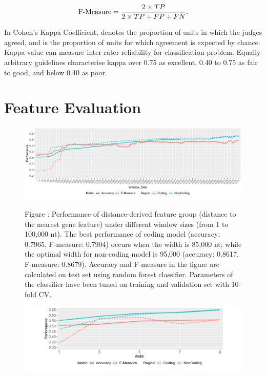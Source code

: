 \documentclass[a4paper,nohyper,nobib,openany,justified]{tufte-book}
\begin{document}
\begin{fullwidth}
\begin{equation}
    \text{F-Measure} = \frac{2 \times TP}{2 \times TP+FP+FN} .\nonumber\\
\end{equation}
\vspace*{2pt}

In Cohen's Kappa Coefficient,  denotes the proportion of units in which the judges agreed, and  is the proportion of units for which agreement is expected by chance. Kappa value can measure inter-rater reliability for classification problem. Equally arbitrary guidelines \cite{Fleiss2003} characterise kappa over 0.75 as excellent, 0.40 to 0.75 as fair to good, and below 0.40 as poor.

\section{Feature Evaluation}

\begin{figure}[tb]
  \includegraphics[width=\linewidth]{perf_distance.pdf}%

  \smallskip\noindent\small Figure \thefigure:
Performance of distance-derived feature group (distance to the nearest gene feature) under different window sizes (from 1 to 100,000 nt). The best performance of coding model (accuracy: 0.7965, F-measure: 0.7904) occurs when the width is 85,000 nt; while the optimal width for non-coding model is 95,000 (accuracy: 0.8617, F-measure: 0.8679). Accuracy and F-measure in the figure are calculated on test set using random forest classifier. Parameters of the classifier have been tuned on training and validation set with 10-fold CV. %
  \label{fig:dist}%
\end{figure}

\begin{figure}[b!]
  \includegraphics[width=\linewidth]{perf_gc.pdf}%


\end{figure}
\end{fullwidth}
\end{document}
